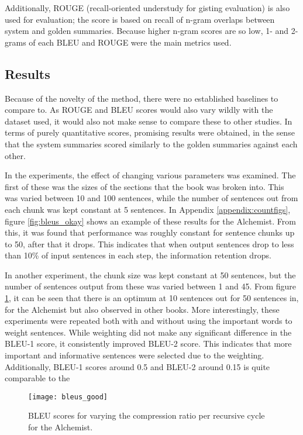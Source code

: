 Additionally, ROUGE (recall-oriented understudy for gisting evaluation) is also used for evaluation; the score is based on recall of n-gram overlaps between system and golden summaries. Because higher n-gram scores are so low, 1- and 2- grams of each BLEU and ROUGE were the main metrics used.

\subsection{Results}
Because of the novelty of the method, there were no established baselines to compare to. As ROUGE and BLEU scores would also vary wildly with the dataset used, it would also not make sense to compare these to other studies. In terms of purely quantitative scores, promising results were obtained, in the sense that the system summaries scored similarly to the golden summaries against each other.

In the experiments, the effect of changing various parameters was examined. The first of these was the sizes of the sections that the book was broken into. This was varied between 10 and 100 sentences, while the number of sentences out from each chunk was kept constant at 5 sentences. In Appendix \ref{appendix:countfigs}, figure \ref{fig:bleus_okay} shows an example of these results for the Alchemist. From this, it was found that performance was roughly constant for sentence chunks up to 50, after that it drops. This indicates that when output sentences drop to less than 10\% of input sentences in each step, the information retention drops.

In another experiment, the chunk size was kept constant at 50 sentences, but the number of sentences output from these was varied between 1 and 45. From figure \ref{fig:bleus}, it can be seen that there is an optimum at 10 sentences out for 50 sentences in, for the Alchemist but also observed in other books. More interestingly, these experiments were repeated both with and without using the important words to weight sentences. While weighting did not make any significant difference in the BLEU-1 score, it consistently improved BLEU-2 score. This indicates that more important and informative sentences were selected due to the weighting. Additionally, BLEU-1 scores around 0.5 and BLEU-2 around 0.15 is quite comparable to the 

\begin{figure}[H]
	\centering
	\texttt{[image: bleus\_good]}
	\caption{BLEU scores for varying the compression ratio per recursive cycle for the Alchemist. }\label{fig:bleus}
\end{figure}

